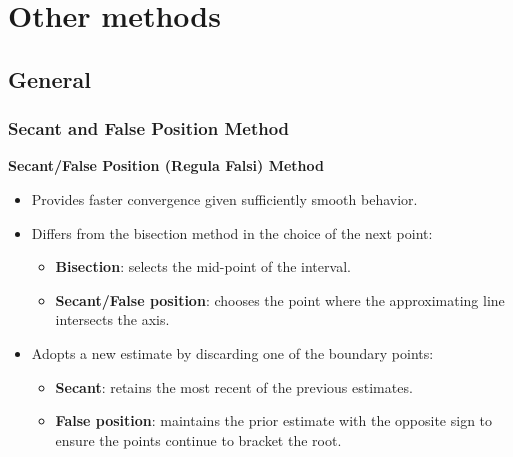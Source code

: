 \section{Other methods}
\subsection*{General}
\begin{frame}[fragile]
  \frametitle{Secant and False Position Method}

  \textbf{Secant/False Position (Regula Falsi) Method}
  \begin{itemize}
    \item Provides faster convergence given sufficiently smooth behavior.
    \item Differs from the bisection method in the choice of the next point:
          \begin{itemize}
            \item \textbf{Bisection}: selects the mid-point of the interval.
            \item \textbf{Secant/False position}: chooses the point where the approximating line intersects the axis.
          \end{itemize}
    \item Adopts a new estimate by discarding one of the boundary points:
          \begin{itemize}
            \item \textbf{Secant}: retains the most recent of the previous estimates.
            \item \textbf{False position}: maintains the prior estimate with the opposite sign to ensure the points continue to bracket the root.
          \end{itemize}
  \end{itemize}
\end{frame}

